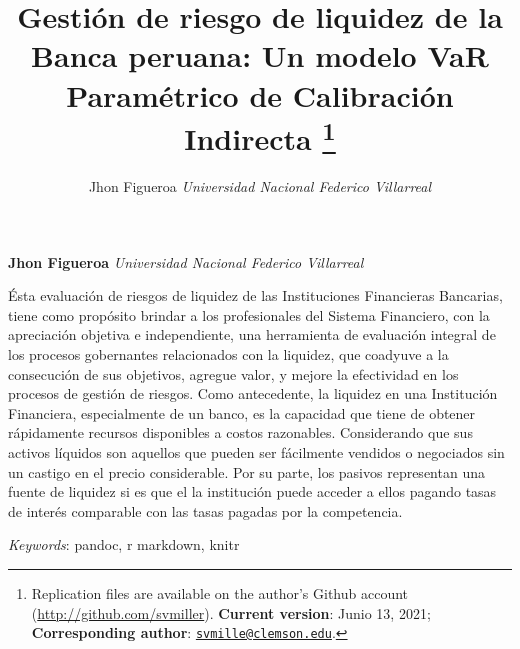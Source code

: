 \documentclass[11pt,]{article}
\title{Gestión de riesgo de liquidez de la Banca peruana: Un modelo VaR
Paramétrico de Calibración Indirecta \thanks{Replication files are
available on the author's Github account
(\url{http://github.com/svmiller}). \textbf{Current version}: Junio 13,
2021; \textbf{Corresponding author}:
\href{mailto:svmille@clemson.edu}{\nolinkurl{svmille@clemson.edu}}.}  }
\author{\Large Jhon
Figueroa\vspace{0.05in} \newline\normalsize\emph{Universidad Nacional
Federico Villarreal}  }
\date{}
\newcommand*{\authorfont}{\fontfamily{phv}\selectfont}
\renewenvironment{abstract}
 {{%
    \setlength{\leftmargin}{0mm}
    \setlength{\rightmargin}{\leftmargin}%
  }%
  \relax}
 {\endlist}
\begin{document}
	
%    


{%
\setlength{\parindent}{0pt}
\thispagestyle{plain}
{\fontsize{18}{20}\selectfont\raggedright 
\maketitle  %

}

{
   \vskip 13.5pt\relax \normalsize\fontsize{11}{12} 
\textbf{\authorfont Jhon Figueroa} \hskip 15pt \emph{\small Universidad
Nacional Federico Villarreal}   

}

}








\begin{abstract}

    \hbox{\vrule height .2pt width 39.14pc}

    \vskip 8.5pt %

\noindent Ésta evaluación de riesgos de liquidez de las Instituciones
Financieras Bancarias, tiene como propósito brindar a los profesionales
del Sistema Financiero, con la apreciación objetiva e independiente, una
herramienta de evaluación integral de los procesos gobernantes
relacionados con la liquidez, que coadyuve a la consecución de sus
objetivos, agregue valor, y mejore la efectividad en los procesos de
gestión de riesgos. Como antecedente, la liquidez en una Institución
Financiera, especialmente de un banco, es la capacidad que tiene de
obtener rápidamente recursos disponibles a costos razonables.
Considerando que sus activos líquidos son aquellos que pueden ser
fácilmente vendidos o negociados sin un castigo en el precio
considerable. Por su parte, los pasivos representan una fuente de
liquidez si es que el la institución puede acceder a ellos pagando tasas
de interés comparable con las tasas pagadas por la competencia.


\vskip 8.5pt \noindent \emph{Keywords}: pandoc, r markdown, knitr \par

    \hbox{\vrule height .2pt width 39.14pc}



\end{abstract}
\end{document}
